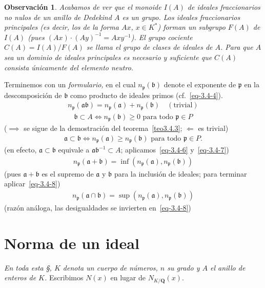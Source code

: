 \documentclass[oneside,bibtotoc,leqno,spanish]{amsbook}
\newcommand{\QQ}{\mathbf{Q}}
\newcommand{\idl}[1]{\mathfrak{#1}}
\numberwithin{equation}{section}
\theoremstyle{defi}
\theoremstyle{note}
\theoremstyle{rem}
\newtheorem*{remark*}{Observaci\'on}
\numberwithin{theorem}{section}
\numberwithin{proposition}{section}
\numberwithin{definition}{section}
\numberwithin{lemma}{section}
\numberwithin{corollary}{section}
\numberwithin{example}{section}
\numberwithin{footnote}{section}%
\begin{document}
\begin{remark*}
Acabamos de ver que el monoide $I(A)$ de ideales fraccionarios no nulos de un anillo de Dedekind $A$
es un grupo. Los ideales fraccionarios {\em principales} (es decir, los de la forma $Ax$, $x\in K^{*}$)
forman un subgrupo $F(A)$ de $I(A)$ (pues $(Ax)\cdot(Ay)^{-1} = Axy^{-1}$). El grupo cociente
$C(A) = I(A)/F(A)$ se llama el {\em grupo de clases de ideales} de $A$. Para que $A$ sea un dominio
de ideales principales es necesario y suficiente que $C(A)$ consista \'unicamente del elemento neutro.
\end{remark*}

Terminemos con un {\em formulario,} en el cual $n_{\idl{p}}(\idl{b})$ denote el exponente de $\idl{p}$
en la descomposici\'on de $\idl{b}$ como producto de ideales primos (cf.~\eqref{eq-3.4-4}).
\begin{gather}\label{eq-3.4-6}
n_{\idl{p}}(\idl{a}\idl{b}) = n_{\idl{p}}(\idl{a})+n_{\idl{p}}(\idl{b})\quad(\text{trivial})
\end{gather}
\begin{gather}\label{eq-3.4-7}
\idl{b}\subset A\iff n_{\idl{p}}(\idl{b})\geq 0\text{ para todo }\idl{p}\in P
\end{gather}
($\implies$ se sigue de la demostraci\'on del teorema~\ref{teo3.4.3}; $\Leftarrow$ es trivial)
\begin{gather}\label{eq-3.4-8}
\idl{a}\subset\idl{b}\iff n_{\idl{p}}(\idl{a})\geq n_{\idl{p}}(\idl{b})\text{ para todo }\idl{p}\in P.
\end{gather}
(en efecto, $\idl{a}\subset\idl{b}$ equivale a $\idl{a}\idl{b}^{-1}\subset A$; aplicamos~\eqref{eq-3.4-6} y~\eqref{eq-3.4-7})
\begin{gather}
n_{\idl{p}}(\idl{a}+\idl{b}) = \inf(n_{\idl{p}}(\idl{a}),n_{\idl{p}}(\idl{b}))
\end{gather}
(pues $\idl{a}+\idl{b}$ es el supremo de $\idl{a}$ y $\idl{b}$ para la inclusi\'on de ideales; para
terminar aplicar~\eqref{eq-3.4-8})
\begin{gather}
n_{\idl{p}}(\idl{a}\cap\idl{b}) = \sup(n_{\idl{p}}(\idl{a}),n_{\idl{p}}(\idl{b}))
\end{gather}
(raz\'on an\'aloga, las desigualdades se invierten en~\eqref{eq-3.4-8})

\section{Norma de un ideal}\label{sec3.5}

\begin{trivlist}\item
{\itshape En toda esta \S, $K$ denota un cuerpo de n\'umeros, $n$ su grado y $A$ el anillo
de enteros de $K$.} Escribimos $N(x)$ en lugar de $N_{K/\QQ}(x)$.
\end{trivlist}
\end{document}
